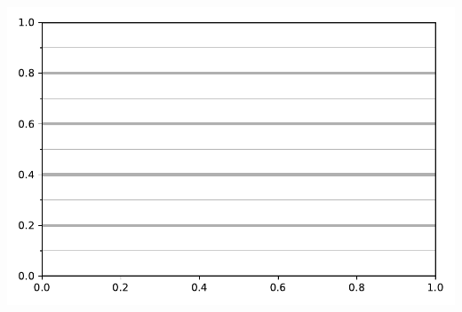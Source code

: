 
\begin{center}
    \includegraphics[width = .8\textwidth]{figures/proseplots/grids-multi.pdf}
\end{center}



